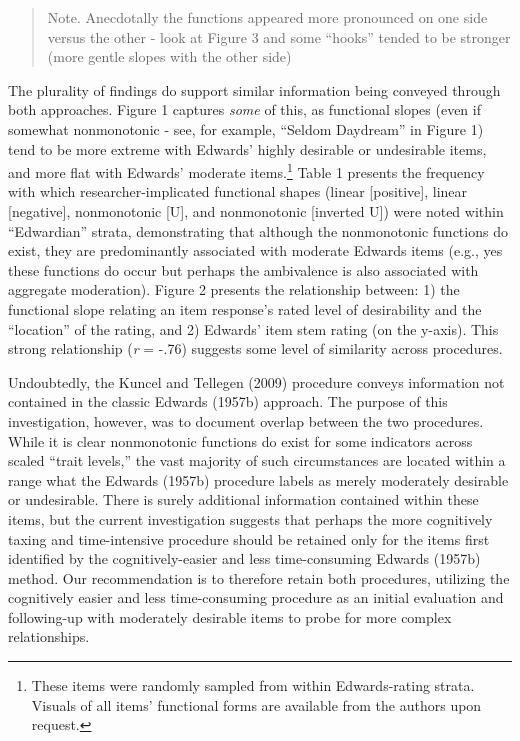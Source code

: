 \documentclass[
  ,jou]{apa6}
\begin{document}
\begin{quote}
Note. Anecdotally the functions appeared more pronounced on one side versus the other - look at Figure 3 and some ``hooks'' tended to be stronger (more gentle slopes with the other side)
\end{quote}

The plurality of findings do support similar information being conveyed through both approaches. Figure 1 captures \emph{some} of this, as functional slopes (even if somewhat nonmonotonic - see, for example, ``Seldom Daydream'' in Figure 1) tend to be more extreme with Edwards' highly desirable or undesirable items, and more flat with Edwards' moderate items.\footnote{These items were randomly sampled from within Edwards-rating strata. Visuals of all items' functional forms are available from the authors upon request.} Table 1 presents the frequency with which researcher-implicated functional shapes (linear {[}positive{]}, linear {[}negative{]}, nonmonotonic {[}U{]}, and nonmonotonic {[}inverted U{]}) were noted within ``Edwardian'' strata, demonstrating that although the nonmonotonic functions do exist, they are predominantly associated with moderate Edwards items (e.g., yes these functions do occur but perhaps the ambivalence is also associated with aggregate moderation). Figure 2 presents the relationship between: 1) the functional slope relating an item response's rated level of desirability and the ``location'' of the rating, and 2) Edwards' item stem rating (on the y-axis). This strong relationship (\emph{r} = -.76) suggests some level of similarity across procedures.

Undoubtedly, the Kuncel and Tellegen (2009) procedure conveys information not contained in the classic Edwards (1957b) approach. The purpose of this investigation, however, was to document overlap between the two procedures. While it is clear nonmonotonic functions do exist for some indicators across scaled ``trait levels,'' the vast majority of such circumstances are located within a range what the Edwards (1957b) procedure labels as merely moderately desirable or undesirable. There is surely additional information contained within these items, but the current investigation suggests that perhaps the more cognitively taxing and time-intensive procedure should be retained only for the items first identified by the cognitively-easier and less time-consuming Edwards (1957b) method. Our recommendation is to therefore retain both procedures, utilizing the cognitively easier and less time-consuming procedure as an initial evaluation and following-up with moderately desirable items to probe for more complex relationships.
\end{document}
